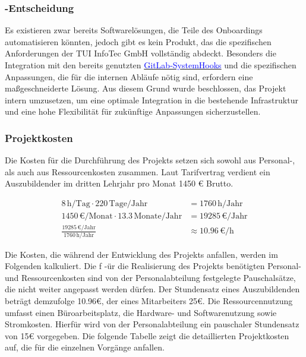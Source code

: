 \subsubsection{-Entscheidung}
\label{sec:MakeOrBuyEntscheidung}

Es existieren zwar bereits Softwarelösungen, die Teile des Onboardings automatisieren könnten, jedoch gibt es kein Produkt, das die spezifischen Anforderungen der \ac{TUI} InfoTec GmbH vollständig abdeckt. Besonders die Integration mit den bereits genutzten \hyperlink{GitLabSystemHooks}{\textcolor{blue}{GitLab-SystemHooks}} und die spezifischen Anpassungen, die für die internen Abläufe nötig sind, erfordern eine maßgeschneiderte Lösung. Aus diesem Grund wurde beschlossen, das Projekt intern umzusetzen, um eine optimale Integration in die bestehende Infrastruktur und eine hohe Flexibilität für zukünftige Anpassungen sicherzustellen.

\subsubsection{Projektkosten}
\label{sec:Projektkosten}

Die Kosten für die Durchführung des Projekts setzen sich sowohl aus
Personal-, als auch aus Ressourcenkosten zusammen. Laut Tarifvertrag verdient ein Auszubildender
im dritten Lehrjahr pro Monat 1450 € Brutto.

\begin{align}
    8 \, \text{h/Tag} \cdot 220 \, \text{Tage/Jahr} &= 1760 \, \text{h/Jahr} \tag{1}\\
    1450 \, \text{€/Monat} \cdot 13.3 \, \text{Monate/Jahr} &= 19285 \, \text{€/Jahr} \tag{2}\\
    \frac{19285 \, \text{€/Jahr}}{1760 \, \text{h/Jahr}} &\approx 10.96 \, \text{€/h} \tag{3}
\end{align}

Die Kosten, die während der Entwicklung des Projekts anfallen, werden im Folgenden kalkuliert. Die f
-ür die Realisierung des Projekts benötigten Personal- und Ressourcenkosten sind von der Personalabteilung festgelegte Pauschalsätze, die nicht weiter angepasst werden dürfen. Der Stundensatz eines Auszubildenden beträgt demzufolge 10.96€, der eines Mitarbeiters 25€. Die Ressourcennutzung umfasst einen Büroarbeitsplatz, die Hardware- und Softwarenutzung sowie Stromkosten. Hierfür wird von der Personalabteilung ein pauschaler Stundensatz von 15€ vorgegeben. Die folgende Tabelle zeigt die detaillierten Projektkosten auf, die für die einzelnen Vorgänge anfallen.

